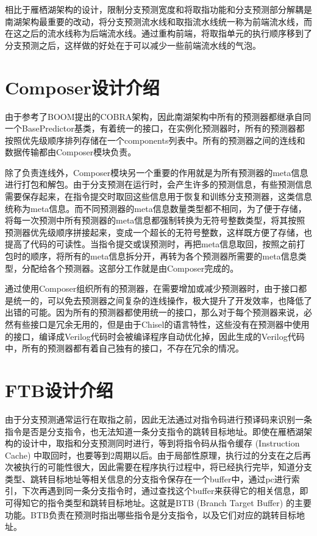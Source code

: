 相比于雁栖湖架构的设计，限制分支预测宽度和将取指功能和分支预测部分解耦是南湖架构最重要的改动，将分支预测流水线和取指流水线统一称为前端流水线，而在这之后的流水线称为后端流水线。通过重构前端，将取指单元的执行顺序移到了分支预测之后，这样做的好处在于可以减少一些前端流水线的气泡。

\section{Composer设计介绍}

由于参考了BOOM提出的COBRA架构\cite{cobra}，因此南湖架构中所有的预测器都继承自同一个BasePredictor基类，有着统一的接口，在实例化预测器时，所有的预测器都按照优先级顺序排列存储在一个components列表中。所有的预测器之间的连线和数据传输都由Composer模块负责。

除了负责连线外，Composer模块另一个重要的作用就是为所有预测器的meta信息进行打包和解包。由于分支预测在运行时，会产生许多的预测信息，有些预测信息需要保存起来，在指令提交时取回这些信息用于恢复和训练分支预测器，这类信息统称为meta信息。而不同预测器的meta信息数量类型都不相同，为了便于存储，将每一次预测中所有预测器的meta信息都强制转换为无符号整数类型，将其按照预测器优先级顺序拼接起来，变成一个超长的无符号整数，这样既方便了存储，也提高了代码的可读性。当指令提交或误预测时，再把meta信息取回，按照之前打包时的顺序，将所有的meta信息拆分开，再转为各个预测器所需要的meta信息类型，分配给各个预测器。这部分工作就是由Composer完成的。

通过使用Composer组织所有的预测器，在需要增加或减少预测器时，由于接口都是统一的，可以免去预测器之间复杂的连线操作，极大提升了开发效率，也降低了出错的可能。因为所有的预测器都使用统一的接口，那么对于每个预测器来说，必然有些接口是冗余无用的，但是由于Chisel的语言特性，这些没有在预测器中使用的接口，编译成Verilog代码时会被编译程序自动优化掉，因此生成的Verilog代码中，所有的预测器都有着自己独有的接口，不存在冗余的情况。

\section{FTB设计介绍}

由于分支预测通常运行在取指之前，因此无法通过对指令码进行预译码来识别一条指令是否是分支指令，也无法知道一条分支指令的跳转目标地址。即使在雁栖湖架构的设计中，取指和分支预测同时进行，等到将指令码从指令缓存 (Instruction Cache) 中取回时，也要等到2周期以后。由于局部性原理，执行过的分支在之后再次被执行的可能性很大，因此需要在程序执行过程中，将已经执行完毕，知道分支类型、跳转目标地址等相关信息的分支指令保存在一个buffer中，通过pc进行索引，下次再遇到同一条分支指令时，通过查找这个buffer来获得它的相关信息，即可得知它的指令类型和跳转目标地址。这就是BTB (Branch Target Buffer) 的主要功能。BTB负责在预测时指出哪些指令是分支指令，以及它们对应的跳转目标地址。

